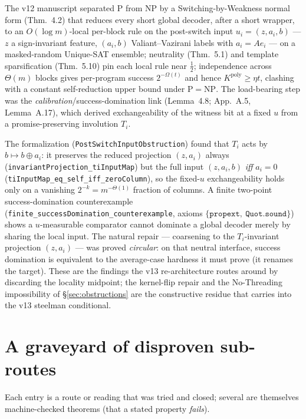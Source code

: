 \documentclass[11pt]{article}
\theoremstyle{definition}
\newcommand{\Kpoly}{K^{\mathrm{poly}}}
\begin{document}
The v12 manuscript separated $\mathrm{P}$ from $\mathrm{NP}$ by a
Switching-by-Weakness normal form (Thm.~4.2) that reduces every short global
decoder, after a short wrapper, to an $O(\log m)$-local per-block rule on the
post-switch input $u_i=(z,a_i,b)$ --- $z$ a sign-invariant feature, $(a_i,b)$
Valiant--Vazirani labels with $a_i=Ae_i$ --- on a masked-random Unique-SAT
ensemble; neutrality (Thm.~5.1) and template sparsification (Thm.~5.10) pin each
local rule near $\tfrac12$; independence across $\Theta(m)$ blocks gives per-program
success $2^{-\Omega(t)}$ and hence $\Kpoly\ge\eta t$, clashing with a constant
self-reduction upper bound under $\mathrm{P}=\mathrm{NP}$. The load-bearing step
was the \emph{calibration}/success-domination link (Lemma~4.8; App.~A.5,
Lemma~A.17), which derived exchangeability of the witness bit at a fixed $u$ from a
promise-preserving involution $T_i$.

The formalization (\texttt{PostSwitchInputObstruction}) found that $T_i$ acts by
$b\mapsto b\oplus a_i$: it preserves the reduced projection $(z,a_i)$ always
(\texttt{invariantProjection\_tiInputMap}) but the full input $(z,a_i,b)$
\emph{iff} $a_i=0$ (\texttt{tiInputMap\_eq\_self\_iff\_zeroColumn}), so the
fixed-$u$ exchangeability holds only on a vanishing $2^{-k}=m^{-\Theta(1)}$
fraction of columns. A finite two-point success-domination counterexample
(\texttt{finite\_successDomination\_counterexample}, axioms
$\{\texttt{propext},\ \texttt{Quot.sound}\}$) shows a $u$-measurable comparator
cannot dominate a global decoder merely by sharing the local input. The natural
repair --- coarsening to the $T_i$-invariant projection $(z,a_i)$ --- was proved
\emph{circular}: on that neutral interface, success domination is equivalent to the
average-case hardness it must prove (it renames the target). These are the
findings the v13 re-architecture routes around by discarding the locality midpoint;
the kernel-flip repair and the No-Threading impossibility of \S\ref{sec:obstructions}
are the constructive residue that carries into the v13 steelman conditional.

\section{A graveyard of disproven sub-routes}
\label{app:graveyard}

Each entry is a route or reading that was tried and closed; several are themselves
machine-checked theorems (that a stated property \emph{fails}).
\end{document}
